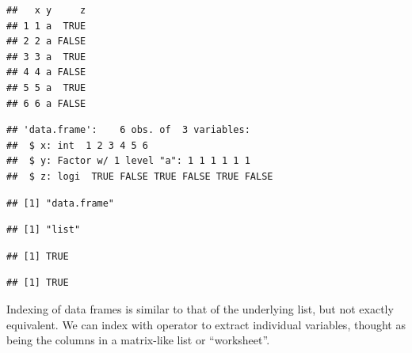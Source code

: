 \documentclass[krantz2]{krantz}\usepackage{knitr}%
\begin{document}
\begin{knitrout}\footnotesize
{}\color{fgcolor}\begin{kframe}
\begin{alltt}
 \hlkwb{<-} \hlstd{(} \hlstd{=} \hlopt{:}\hlstd{,}  \hlstd{=} \hlstd{,}  \hlstd{=} \hlstd{(}\hlstd{,} \hlstd{))}
\end{alltt}
\begin{verbatim}
##   x y     z
## 1 1 a  TRUE
## 2 2 a FALSE
## 3 3 a  TRUE
## 4 4 a FALSE
## 5 5 a  TRUE
## 6 6 a FALSE
\end{verbatim}
\begin{alltt}
\end{alltt}
\begin{verbatim}
## 'data.frame':	6 obs. of  3 variables:
##  $ x: int  1 2 3 4 5 6
##  $ y: Factor w/ 1 level "a": 1 1 1 1 1 1
##  $ z: logi  TRUE FALSE TRUE FALSE TRUE FALSE
\end{verbatim}
\begin{alltt}
\end{alltt}
\begin{verbatim}
## [1] "data.frame"
\end{verbatim}
\begin{alltt}
\end{alltt}
\begin{verbatim}
## [1] "list"
\end{verbatim}
\begin{alltt}
\end{alltt}
\begin{verbatim}
## [1] TRUE
\end{verbatim}
\begin{alltt}
\end{alltt}
\begin{verbatim}
## [1] TRUE
\end{verbatim}
\end{kframe}
\end{knitrout}

Indexing of data frames is similar to that of the underlying list, but not exactly equivalent. We can index with operator \Roperator{[[]]} to extract individual variables, thought as being the columns in a matrix-like list or ``worksheet''.
\end{document}
